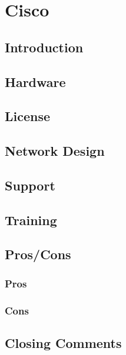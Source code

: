 \section{Cisco}

\subsection{Introduction}
\subsection{Hardware}
\subsection{License}
\subsection{Network Design}
\subsection{Support}
\subsection{Training}
\subsection{{Pros/Cons}}
\subsubsection{Pros}
\subsubsection{Cons}
\subsection{Closing Comments}